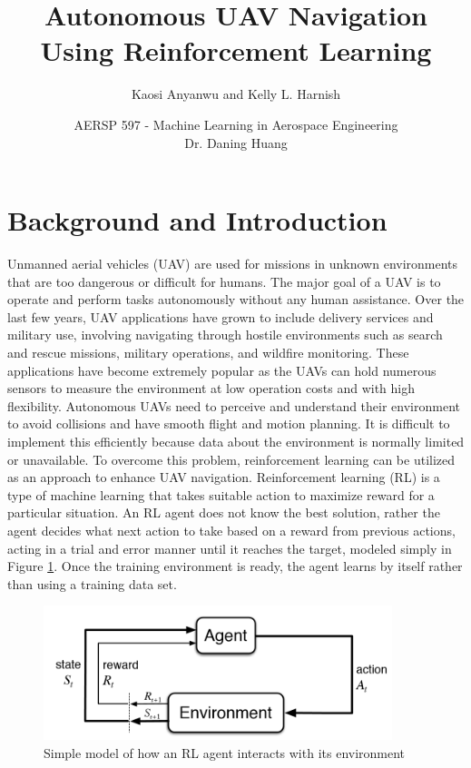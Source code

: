\documentclass[conf]{new-aiaa}
\title{Autonomous UAV Navigation Using Reinforcement Learning}
\author{Kaosi Anyanwu and Kelly L. Harnish }
\affil{ ... }
\author{AERSP 597 - Machine Learning in Aerospace Engineering \\ Dr. Daning Huang}
\affil{Pennsylvania State University, State College, PA 16802}
\begin{document}
	
\maketitle

\section{Background and Introduction}

Unmanned aerial vehicles (UAV) are used for missions in unknown environments that are too dangerous or difficult for humans. The major goal of a UAV is to operate and perform tasks autonomously without any human assistance. Over the last few years, UAV applications have grown to include delivery services and military use, involving navigating through hostile environments such as search and rescue missions, military operations, and wildfire monitoring. These applications have become extremely popular as the UAVs can hold numerous sensors to measure the environment at low operation costs and with high flexibility. Autonomous UAVs need to perceive and understand their environment to avoid collisions and have smooth flight and motion planning. It is difficult to implement this efficiently because data about the environment is normally limited or unavailable. To overcome this problem, reinforcement learning can be utilized as an approach to enhance UAV navigation. Reinforcement learning (RL) is a type of machine learning that takes suitable action to maximize reward for a particular situation. An RL agent does not know the best solution, rather the agent decides what next action to take based on a reward from previous actions, acting in a trial and error manner until it reaches the target, modeled simply in Figure \ref{fig:RLmodel}. Once the training environment is ready, the agent learns by itself rather than using a training data set. 

\begin{figure}[!htb]
	\centering\includegraphics[width=4in]{RL_agent}
	\caption{\label{fig:RLmodel} Simple model of how an RL agent interacts with its environment}
\end{figure}
\end{document}
